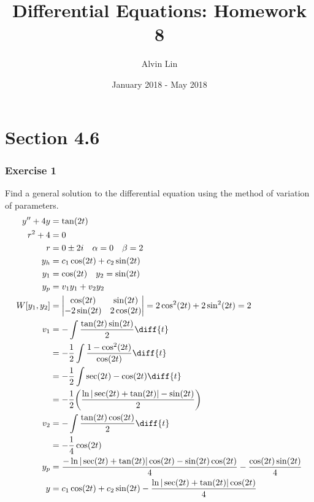 \documentclass{math}
\title{Differential Equations: Homework 8}
\author{Alvin Lin}
\date{January 2018 - May 2018}
\begin{document}
\maketitle
\clearpage

\section*{Section 4.6}

\subsubsection*{Exercise 1}
Find a general solution to the differential equation using the method of
variation of parameters.
\begin{align*}
  y''+4y &= \tan(2t) \\
  r^2+4 &= 0 \\
  r &= 0\pm2i \quad \alpha = 0 \quad \beta = 2 \\
  y_h &= c_1\cos(2t)+c_2\sin(2t) \\
  y_1 &= \cos(2t) \quad y_2 = \sin(2t) \\
  y_p &= v_1y_1+v_2y_2 \\
  W[y_1,y_2] &= \begin{vmatrix}
    \cos(2t) & \sin(2t) \\
    -2\sin(2t) & 2\cos(2t)
  \end{vmatrix} = 2\cos^2(2t)+2\sin^2(2t) = 2 \\
  v_1 &= -\int\frac{\tan(2t)\sin(2t)}{2}\diff{t} \\
  &= -\frac{1}{2}\int\frac{1-\cos^2(2t)}{\cos(2t)}\diff{t} \\
  &= -\frac{1}{2}\int\sec(2t)-\cos(2t)\diff{t} \\
  &= -\frac{1}{2}\bigg(\frac{\ln|\sec(2t)+\tan(2t)|-\sin(2t)}{2}\bigg) \\
  v_2 &= -\int\frac{\tan(2t)\cos(2t)}{2}\diff{t} \\
  &= -\frac{1}{4}\cos(2t) \\
  y_p &= \frac{-\ln|\sec(2t)+\tan(2t)|\cos(2t)-\sin(2t)\cos(2t)}{4}-
    \frac{\cos(2t)\sin(2t)}{4} \\
  y &= c_1\cos(2t)+c_2\sin(2t)-\frac{\ln|\sec(2t)+\tan(2t)|\cos(2t)}{4}
\end{align*}
\end{document}
